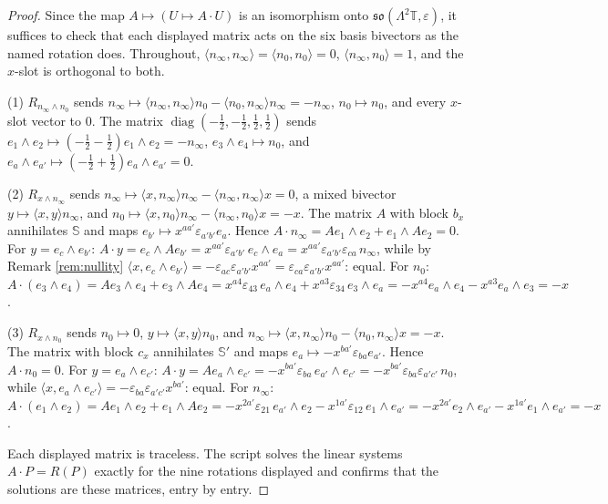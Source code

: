 \documentclass[11pt]{article}
\theoremstyle{definition}
\newcommand{\T}{\mathbb{T}}
\newcommand{\ip}[2]{\langle #1, #2\rangle}
\newcommand{\Sc}{\mathbb{S}}
\begin{document}
\begin{proof}
Since the map $A \mapsto (U \mapsto A\cdot U)$ is an isomorphism onto $\mathfrak{so}(\Lambda^{2}\T,\varepsilon)$, it suffices to check that each displayed matrix acts on the six basis bivectors as the named rotation does. Throughout, $\ip{n_{\infty}}{n_{\infty}} = \ip{n_{0}}{n_{0}} = 0$, $\ip{n_{\infty}}{n_{0}} = 1$, and the $x$-slot is orthogonal to both.

(1) $R_{n_{\infty}\wedge n_{0}}$ sends $n_{\infty} \mapsto \ip{n_{\infty}}{n_{\infty}}n_{0} - \ip{n_{0}}{n_{\infty}}n_{\infty} = -n_{\infty}$, $n_{0} \mapsto n_{0}$, and every $x$-slot vector to $0$. The matrix $\operatorname{diag}(-\tfrac12,-\tfrac12,\tfrac12,\tfrac12)$ sends $e_{1}\wedge e_{2} \mapsto (-\tfrac12 - \tfrac12)e_{1}\wedge e_{2} = -n_{\infty}$, $e_{3}\wedge e_{4} \mapsto n_{0}$, and $e_{a}\wedge e_{a'} \mapsto (-\tfrac12 + \tfrac12)e_{a}\wedge e_{a'} = 0$.

(2) $R_{x\wedge n_{\infty}}$ sends $n_{\infty} \mapsto \ip{x}{n_{\infty}}n_{\infty} - \ip{n_{\infty}}{n_{\infty}}x = 0$, a mixed bivector $y \mapsto \ip{x}{y}n_{\infty}$, and $n_{0} \mapsto \ip{x}{n_{0}}n_{\infty} - \ip{n_{\infty}}{n_{0}}x = -x$. The matrix $A$ with block $b_{x}$ annihilates $\Sc$ and maps $e_{b'} \mapsto x^{aa'}\varepsilon_{a'b'}e_{a}$. Hence $A\cdot n_{\infty} = Ae_{1}\wedge e_{2} + e_{1}\wedge Ae_{2} = 0$. For $y = e_{c}\wedge e_{b'}$: $A\cdot y = e_{c}\wedge Ae_{b'} = x^{aa'}\varepsilon_{a'b'}\,e_{c}\wedge e_{a} = x^{aa'}\varepsilon_{a'b'}\varepsilon_{ca}\,n_{\infty}$, while by Remark \ref{rem:nullity} $\ip{x}{e_{c}\wedge e_{b'}} = -\varepsilon_{ac}\varepsilon_{a'b'}x^{aa'} = \varepsilon_{ca}\varepsilon_{a'b'}x^{aa'}$: equal. For $n_{0}$: $A\cdot(e_{3}\wedge e_{4}) = Ae_{3}\wedge e_{4} + e_{3}\wedge Ae_{4} = x^{a4}\varepsilon_{43}\,e_{a}\wedge e_{4} + x^{a3}\varepsilon_{34}\,e_{3}\wedge e_{a} = -x^{a4}e_{a}\wedge e_{4} - x^{a3}e_{a}\wedge e_{3} = -x$.

(3) $R_{x\wedge n_{0}}$ sends $n_{0} \mapsto 0$, $y \mapsto \ip{x}{y}n_{0}$, and $n_{\infty} \mapsto \ip{x}{n_{\infty}}n_{0} - \ip{n_{0}}{n_{\infty}}x = -x$. The matrix with block $c_{x}$ annihilates $\Sc'$ and maps $e_{a} \mapsto -x^{ba'}\varepsilon_{ba}e_{a'}$. Hence $A\cdot n_{0} = 0$. For $y = e_{a}\wedge e_{c'}$: $A\cdot y = Ae_{a}\wedge e_{c'} = -x^{ba'}\varepsilon_{ba}\,e_{a'}\wedge e_{c'} = -x^{ba'}\varepsilon_{ba}\varepsilon_{a'c'}\,n_{0}$, while $\ip{x}{e_{a}\wedge e_{c'}} = -\varepsilon_{ba}\varepsilon_{a'c'}x^{ba'}$: equal. For $n_{\infty}$: $A\cdot(e_{1}\wedge e_{2}) = Ae_{1}\wedge e_{2} + e_{1}\wedge Ae_{2} = -x^{2a'}\varepsilon_{21}\,e_{a'}\wedge e_{2} - x^{1a'}\varepsilon_{12}\,e_{1}\wedge e_{a'} = -x^{2a'}e_{2}\wedge e_{a'} - x^{1a'}e_{1}\wedge e_{a'} = -x$.

Each displayed matrix is traceless. The script solves the linear systems $A\cdot P = R(P)$ exactly for the nine rotations displayed and confirms that the solutions are these matrices, entry by entry.
\end{proof}
\end{document}
